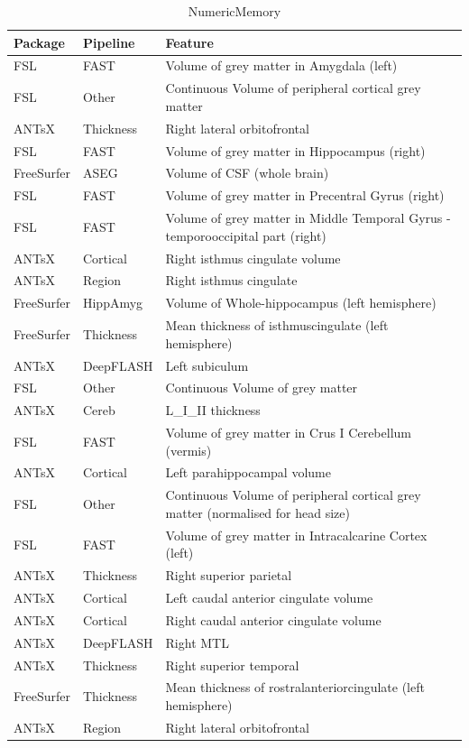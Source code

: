 \documentclass[
  10pt,
]{article}
\begin{document}
\begin{table}

\caption{\label{tab:compare-predictions}NumericMemory}
\centering
\begin{tabular}[t]{lll}
\toprule
Package & Pipeline & Feature\\
\midrule
FSL & FAST & Volume of grey matter in Amygdala (left)\\
FSL & Other & Continuous    Volume of peripheral cortical grey matter\\
ANTsX & Thickness & Right lateral orbitofrontal\\
FSL & FAST & Volume of grey matter in Hippocampus (right)\\
FreeSurfer & ASEG & Volume of CSF (whole brain)\\
\addlinespace
FSL & FAST & Volume of grey matter in Precentral Gyrus (right)\\
FSL & FAST & Volume of grey matter in Middle Temporal Gyrus - temporooccipital part (right)\\
ANTsX & Cortical & Right isthmus cingulate volume\\
ANTsX & Region & Right isthmus cingulate\\
FreeSurfer & HippAmyg & Volume of Whole-hippocampus (left hemisphere)\\
\addlinespace
FreeSurfer & Thickness & Mean thickness of isthmuscingulate (left hemisphere)\\
ANTsX & DeepFLASH & Left subiculum\\
FSL & Other & Continuous    Volume of grey matter\\
ANTsX & Cereb & L\_I\_II thickness\\
FSL & FAST & Volume of grey matter in Crus I Cerebellum (vermis)\\
\addlinespace
ANTsX & Cortical & Left parahippocampal volume\\
FSL & Other & Continuous    Volume of peripheral cortical grey matter (normalised for head size)\\
FSL & FAST & Volume of grey matter in Intracalcarine Cortex (left)\\
ANTsX & Thickness & Right superior parietal\\
ANTsX & Cortical & Left caudal anterior cingulate volume\\
\addlinespace
ANTsX & Cortical & Right caudal anterior cingulate volume\\
ANTsX & DeepFLASH & Right MTL\\
ANTsX & Thickness & Right superior temporal\\
FreeSurfer & Thickness & Mean thickness of rostralanteriorcingulate (left hemisphere)\\
ANTsX & Region & Right lateral orbitofrontal\\
\bottomrule
\end{tabular}
\end{table}
\end{document}
